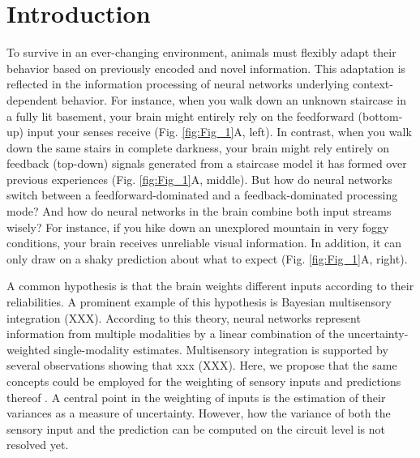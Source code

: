 \documentclass[10pt,a4paper,draft]{article}
\begin{document}
\section*{Introduction}
%
To survive in an ever-changing environment, animals must flexibly adapt their behavior based on previously encoded and novel information. This adaptation is reflected in the information processing of neural networks underlying context-dependent behavior. For instance, when you walk down an unknown staircase in a fully lit basement, your brain might entirely rely on the feedforward (bottom-up) input your senses receive (Fig. \ref{fig:Fig_1}A, left). In contrast, when you walk down the same stairs in complete darkness, your brain might rely entirely on feedback (top-down) signals generated from a staircase model it has formed over previous experiences (Fig. \ref{fig:Fig_1}A, middle). But how do neural networks switch between a feedforward-dominated and a feedback-dominated processing mode? And how do neural networks in the brain combine both input streams wisely? For instance, if you hike down an unexplored mountain in very foggy conditions, your brain receives unreliable visual information. In addition, it can only draw on a shaky prediction about what to expect (Fig. \ref{fig:Fig_1}A, right). 

A common hypothesis is that the brain weights different inputs according to their reliabilities. A prominent example of this hypothesis is Bayesian multisensory integration (XXX). According to this theory, neural networks represent information from multiple modalities by a linear combination of the uncertainty-weighted single-modality estimates. Multisensory integration is supported by several observations showing that xxx (XXX). Here, we propose that the same concepts could be employed for the weighting of sensory inputs and predictions thereof \citep{yon2021precision}. A central point in the weighting of inputs is the estimation of their variances as a measure of uncertainty. However, how the variance of both the sensory input and the prediction can be computed on the circuit level is not resolved yet.  
\end{document}

